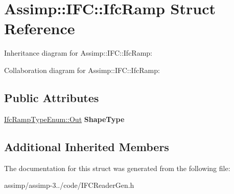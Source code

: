 \hypertarget{struct_assimp_1_1_i_f_c_1_1_ifc_ramp}{\section{Assimp\+:\+:I\+F\+C\+:\+:Ifc\+Ramp Struct Reference}
\label{struct_assimp_1_1_i_f_c_1_1_ifc_ramp}
}


Inheritance diagram for Assimp\+:\+:I\+F\+C\+:\+:Ifc\+Ramp\+:


Collaboration diagram for Assimp\+:\+:I\+F\+C\+:\+:Ifc\+Ramp\+:
\subsection*{Public Attributes}
\begin{DoxyCompactItemize}
\item 
\hypertarget{struct_assimp_1_1_i_f_c_1_1_ifc_ramp_a86a2bd706bee37109f26786cd8599a88}{\hyperlink{classboost_1_1shared__ptr}{Ifc\+Ramp\+Type\+Enum\+::\+Out} {\bfseries Shape\+Type}}\label{struct_assimp_1_1_i_f_c_1_1_ifc_ramp_a86a2bd706bee37109f26786cd8599a88}

\end{DoxyCompactItemize}
\subsection*{Additional Inherited Members}


The documentation for this struct was generated from the following file\+:\begin{DoxyCompactItemize}
\item 
assimp/assimp-\/3../code/I\+F\+C\+Reader\+Gen.\+h\end{DoxyCompactItemize}
